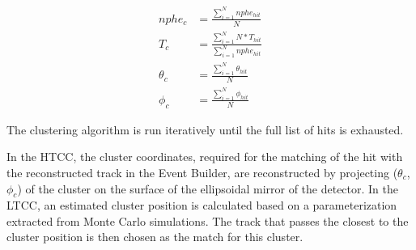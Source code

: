 \begin{eqnarray}
nphe_c &= \frac{\sum_{i=1}^N{nphe_{hit}}}{N}\\
T_c &= \frac{\sum_{i=1}^N{N*T_{hit}}}{\sum_{i=1}^N{nphe_{hit}}}\\
\theta_c &=\frac{\sum_{i=1}^N{\theta_{hit}}}{N}\\
\phi_c &= \frac{\sum_{i=1}^N{\phi_{hit}}}{N}
\end{eqnarray}

\noindent
The clustering algorithm is run iteratively until the full list of hits is exhausted.

In the HTCC, the cluster coordinates, required for the matching of the hit with the reconstructed track in the
Event Builder, are reconstructed by projecting  ($\theta_c$, $\phi_c$) of the cluster on the surface of the
ellipsoidal mirror of the detector. In the LTCC, an estimated cluster position is calculated based on a
parameterization extracted from Monte Carlo simulations. The track that passes the closest to the cluster
position is then chosen as the match for this cluster.
